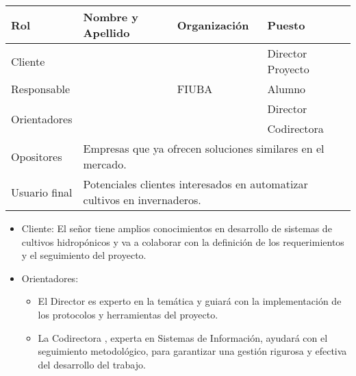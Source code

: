 \begin{table}[ht]
	\begin{tabularx}{\linewidth}{|p{2.15cm}|p{5.8cm}|p{2.85cm}|p{3.4cm}|}
		\hline
		\rowcolor[HTML]{C0C0C0}
		Rol                           & Nombre y Apellido                                                                              & Organización    & Puesto              \\ \hline
		Cliente                       & \clientename                                                                                   & \empclientename & Director Proyecto \\ \hline
		Responsable                   & \authorname                                                                                    & FIUBA           & Alumno              \\ \hline
		\multirow{2}{*}{Orientadores} & \supname                                                                                       & \pertesupname   & Director            \\
		                              & \cosupname                                                                                     & \pertecosupname & Codirectora         \\ \hline
		Opositores                    & \multicolumn{3}{l|}{Empresas que ya ofrecen soluciones similares en el mercado.}                                                       \\ \hline
		Usuario final                 & \multicolumn{3}{l|}{Potenciales clientes interesados en automatizar cultivos en invernaderos.}                                         \\ \hline
	\end{tabularx}
\end{table}

\begin{itemize}
	\item Cliente: El señor \clientename\hspace{1px} tiene amplios conocimientos en
	      desarrollo de sistemas de cultivos hidropónicos y va a colaborar con la definición de los
	      requerimientos y el seguimiento del proyecto.
	\item Orientadores:
	      \begin{itemize}
		      \item El Director \supname\hspace{1px} es experto en la temática y guiará con la
		            implementación de los protocolos y herramientas del proyecto.
		      \item La Codirectora \cosupname , experta en Sistemas de Información, ayudará con el
		            seguimiento metodológico, para garantizar una gestión rigurosa y efectiva del
		            desarrollo del trabajo.
	      \end{itemize}
\end{itemize}